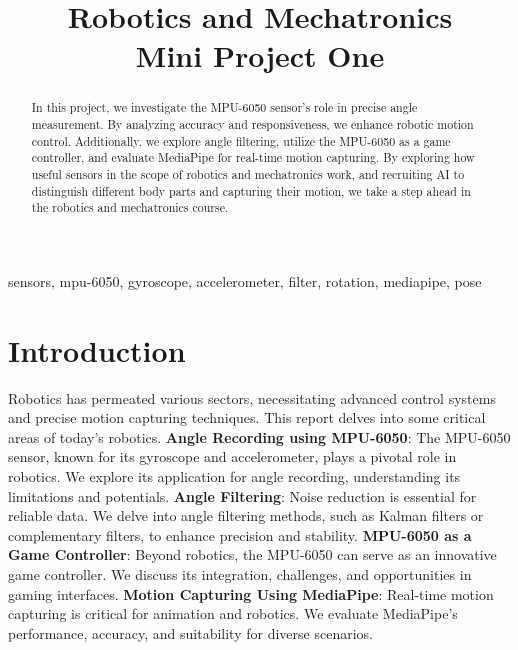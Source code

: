 \documentclass[conference]{IEEEtran}
\title{Robotics and Mechatronics\\
{\LARGE Mini Project One}
}
\author{
    \IEEEauthorblockN{Abolfazl Nateghi}
    \IEEEauthorblockA{\small \textit{School of Mechanical Engineering} \\
    \footnotesize \textit{College of Engineering, University of Tehran \,}\\
    abolfazlnateghi@ut.ac.ir \\
    810699275}
    \and
    \IEEEauthorblockN{Hamed Moshtaghian}
    \IEEEauthorblockA{\small \textit{School of Mechanical Engineering} \\
    \footnotesize \textit{College of Engineering, University of Tehran \,}\\
    hamedmoshtaghian@ut.ac.ir \\
    810699265}
    \and
    \IEEEauthorblockN{Mohammad Montazeri}
    \IEEEauthorblockA{\small \textit{School of Mechanical Engineering} \\
    \footnotesize \textit{College of Engineering, University of Tehran \,}\\
    mohammadmontazeri@ut.ac.ir \\
    810699269}
}
\begin{document}
\maketitle

\begin{abstract}
    In this project, we investigate the MPU-6050 sensor's role in precise angle measurement. By analyzing accuracy and responsiveness, we enhance robotic motion control. Additionally, we explore angle filtering, utilize the MPU-6050 as a game controller, and evaluate MediaPipe for real-time motion capturing. By exploring how useful sensors in the scope of robotics and mechatronics work, and recruiting AI to distinguish different body parts and capturing their motion, we take a step ahead in the robotics and mechatronics course.
\end{abstract}

\begin{IEEEkeywords}
    sensors, mpu-6050, gyroscope, accelerometer, filter, rotation, mediapipe, pose
\end{IEEEkeywords}

\section{Introduction}
Robotics has permeated various sectors, necessitating advanced control systems and precise motion capturing techniques. This report delves into some critical areas of today's robotics. \textbf{Angle Recording using MPU-6050}: The MPU-6050 sensor, known for its gyroscope and accelerometer, plays a pivotal role in robotics. We explore its application for angle recording, understanding its limitations and potentials. \textbf{Angle Filtering}: Noise reduction is essential for reliable data. We delve into angle filtering methods, such as Kalman filters or complementary filters, to enhance precision and stability. \textbf{MPU-6050 as a Game Controller}: Beyond robotics, the MPU-6050 can serve as an innovative game controller. We discuss its integration, challenges, and opportunities in gaming interfaces. \textbf{Motion Capturing Using MediaPipe}: Real-time motion capturing is critical for animation and robotics. We evaluate MediaPipe's performance, accuracy, and suitability for diverse scenarios.
\vspace{8px}
\end{document}

